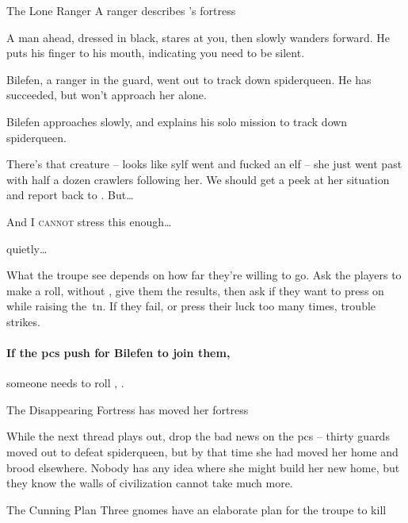 {The Lone Ranger}%
{A  ranger describes 's fortress}%

\begin{boxtext}
  A man ahead, dressed in black, stares at you, then slowly wanders forward.
  He puts his finger to his mouth, indicating you need to be silent.
\end{boxtext}

Bilefen, a ranger in the \gls{guard}, went out to track down \gls{spiderqueen}.
He has succeeded, but won't approach her alone.

Bilefen approaches slowly, and explains his solo mission to track down \gls{spiderqueen}.

\begin{speechtext}
  \small
  There's that creature -- looks like \gls{sylf} went and fucked an elf -- she just went past with half a dozen \glspl{crawler} following her.
  We should get a peek at her situation and report back to .
  But\ldots

  And I {\large\scshape cannot} stress this enough\ldots

  \noindent
  quietly\ldots
\end{speechtext}

What the troupe see depends on how far they're willing to go.
Ask the players to make a  roll, without , give them the results, then ask if they want to press on while raising the~\gls{tn}.
If they fail, or press their luck too many times, trouble strikes.

\paragraph{If the \glspl{pc} push for Bilefen to join them,}
someone needs to roll , \tn[11].

{The Disappearing Fortress}%
{ has moved her fortress}%

While the next \gls{thread} plays out, drop the bad news on the \glspl{pc} -- thirty \glspl{guard} moved out to defeat \gls{spiderqueen}, but by that time she had moved her home and brood elsewhere.
Nobody has any idea where she might build her new home, but they know the walls of civilization cannot take much more.

{The Cunning Plan}%
{Three gnomes have an elaborate plan for the troupe to kill }%

